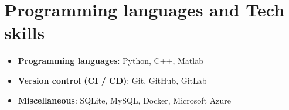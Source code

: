 \documentclass[letterpaper,12pt]{article}
\newcommand{\resumeItem}[2]{
    \item\small{
        \textbf{#1}{: #2 \vspace{-2pt}}
    }
}
\newcommand{\resumeSubItem}[2]{\resumeItem{#1}{#2}\vspace{-4pt}}
\newcommand{\resumeSubHeadingListStart}{\begin{itemize}[leftmargin=*]}
\newcommand{\resumeSubHeadingListEnd}{\end{itemize}}
\begin{document}

\section{Programming languages and Tech skills}
    \resumeSubHeadingListStart
        \resumeSubItem{Programming languages}
        {Python, C++, Matlab}
        \resumeSubItem{Version control (CI / CD)}
        {Git, GitHub, GitLab}
        \resumeSubItem{Miscellaneous}
        {SQLite, MySQL, Docker, Microsoft Azure}
    \resumeSubHeadingListEnd
\end{document}
